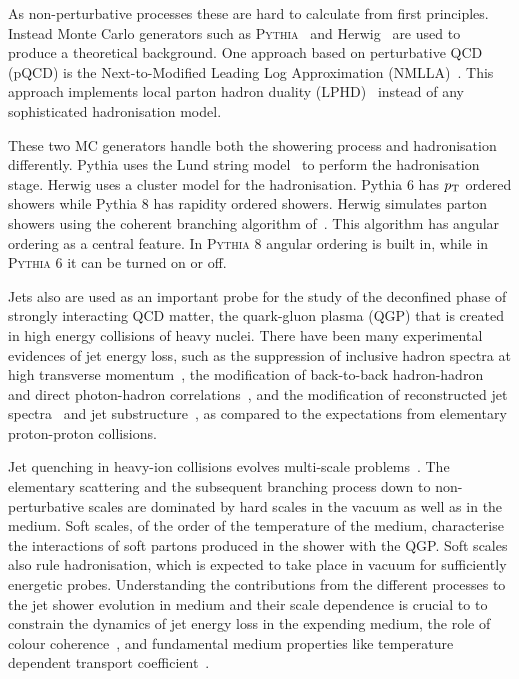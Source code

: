 As non-perturbative processes these are hard to calculate from first principles. Instead Monte Carlo generators such as \textsc{Pythia}~\cite{introPythia81} and Herwig~\cite{herwig7releaseNote} are used to produce a theoretical background. One approach based on perturbative QCD (pQCD) is the Next-to-Modified Leading Log Approximation (NMLLA)~\cite{nmlla}. This approach implements local parton hadron duality (LPHD)~\cite{Azimov:1984np} instead of any sophisticated hadronisation model.

These two MC generators handle both the showering process and hadronisation differently. Pythia uses the Lund string model~\cite{lundString} to perform the hadronisation stage. Herwig uses a cluster model for the hadronisation. Pythia 6 has $p_{\rm T}$ ordered showers while Pythia 8 has rapidity ordered showers. Herwig simulates parton showers using the coherent branching algorithm of~\cite{Gieseke:2003rz}. This algorithm has angular ordering as a central feature. In \textsc{Pythia} 8 angular ordering is built in, while in \textsc{Pythia} 6 it can be turned on or off.

Jets also are used as an important probe for the study of the deconfined phase of strongly interacting QCD matter, the quark-gluon plasma (QGP) that is created in high energy collisions of heavy nuclei.
There have been many experimental evidences of jet energy loss, such as the suppression of inclusive hadron spectra at high transverse momentum~\cite{}, the modification of back-to-back hadron-hadron~\cite{} and direct photon-hadron correlations~\cite{}, and the modification of reconstructed jet spectra~\cite{} and jet substructure~\cite{}, as compared to the expectations from elementary proton-proton collisions.

Jet quenching in heavy-ion collisions evolves multi-scale problems~\cite{Kurkela:2014tla,Tachibana:2018yae}. The elementary scattering and the subsequent branching process down to non-perturbative scales are dominated by hard scales in the vacuum as well as in the medium. Soft scales, of the order of the temperature of the medium, characterise the interactions of soft partons produced in the shower with the QGP. Soft scales also rule hadronisation, which is expected to take place in vacuum for sufficiently energetic probes. Understanding the contributions from the different processes to the jet shower evolution in medium and their scale dependence is crucial to to constrain the dynamics of jet energy loss in the expending medium, the role of colour coherence~\cite{CasalderreySolana:2012ef}, and fundamental medium properties like temperature dependent transport coefficient~\cite{DEramo:2012uzl,Ayala:2016pvm}.

